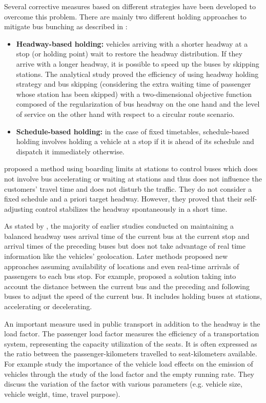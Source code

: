 \documentclass[12pt,a4paper]{article}
\begin{document}
Several corrective measures based on different strategies have been developed to overcome this problem. There are mainly two different holding approaches to mitigate bus bunching as described in \cite{reliability}:

\begin{itemize}
\item \textbf{Headway-based holding:} vehicles arriving with a shorter headway at a stop (or holding point) wait to restore the headway distribution. If they arrive with a longer headway, it is possible to speed up the buses by skipping stations. The analytical study \cite{hybrid} proved the efficiency of using headway holding strategy and bus skipping (considering the extra waiting time of passenger whose station has been skipped) with a two-dimensional objective function composed of the regularization of bus headway on the one hand and the level of service on the other hand with respect to a circular route scenario. 
\item \textbf{Schedule-based holding:} in the case of fixed timetables, schedule-based holding involves holding a vehicle at a stop if it is ahead of its schedule and dispatch it immediately otherwise.
\end{itemize}
  
\cite{selfadjusting} proposed a method using boarding limits at stations to control buses which does not involve bus accelerating or waiting at stations and thus does not influence the customers' travel time and does not disturb the traffic. They do not consider a fixed schedule and a priori target headway. However, they proved that their self-adjusting control stabilizes the headway spontaneously in a short time. 

As stated by \cite{information}, the majority of earlier studies conducted on maintaining a balanced headway uses arrival time of the current bus at the current stop and arrival times of the preceding buses but does not take advantage of real time information like the vehicles' geolocation. Later methods proposed new approaches assuming availability of locations and even real-time arrivals of passengers to each bus stop. For example, \cite{cooperation} proposed a solution taking into account the distance between the current bus and the preceding and following buses to adjust the speed of the current bus. It includes holding buses at stations, accelerating or decelerating. 

An important measure used in public transport in addition to the headway is the load factor. The passenger load factor measures the efficiency of a transportation system, representing the capacity utilization of the seats. It is often expressed as the ratio between the passenger-kilometers travelled to seat-kilometers available. For example \cite{loadfactor} study the importance of the vehicle load effects on the emission of vehicles through the study of the load factor and the empty running rate. They discuss the variation of the factor with various parameters (e.g. vehicle size, vehicle weight, time, travel purpose).
\end{document}
